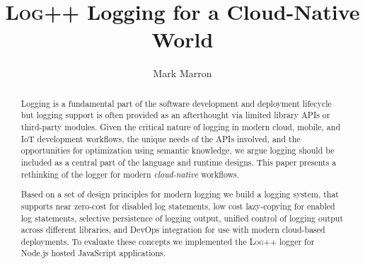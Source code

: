 \documentclass[sigplan,10pt]{acmart}
\newcommand{\projn}{\textsc{Log++}\xspace}
\newcommand{\ourtitle}{\projn Logging for a Cloud-Native World}
\begin{document}

\acmISBN{} %
\acmDOI{} %




\title{\ourtitle}

\author{Mark Marron}

\begin{abstract} 
Logging is a fundamental part of the software development and
deployment lifecycle but logging support is often provided as an afterthought 
via limited library APIs or third-party modules. Given the critical
nature of logging in modern cloud, mobile, and IoT development workflows, the unique needs of the APIs involved,
and the opportunities for optimization using semantic knowledge, we argue logging should
be included as a central part of the language and runtime designs. This paper
presents a rethinking of the logger for modern \emph{cloud-native} workflows. 

Based on a set of design principles for modern logging we build a logging system,
that supports near zero-cost for disabled log statements, low cost lazy-copying 
for enabled log statements, selective persistence of logging output, unified control 
of logging output across different libraries, and DevOps integration for use with 
modern cloud-based deployments. To evaluate these concepts we implemented the \projn 
logger for Node.js hosted JavaScript applications.
\end{abstract}

\maketitle
\end{document}
